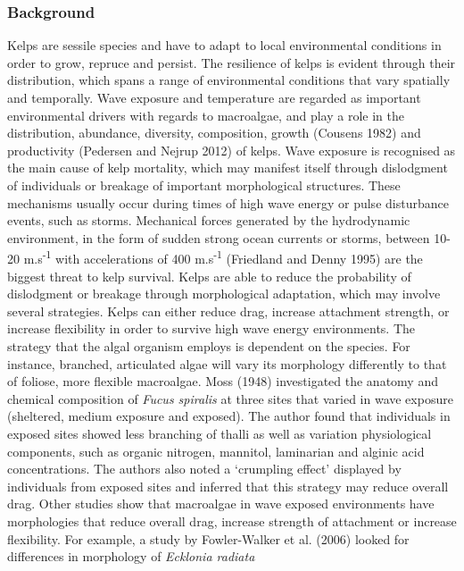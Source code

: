 \documentclass[10pt,a4,]{article}
\begin{document}
\hypertarget{background}{%
\subsubsection{Background}\label{background}}

Kelps are sessile species and have to adapt to local environmental
conditions in order to grow, repruce and persist. The resilience of
kelps is evident through their distribution, which spans a range of
environmental conditions that vary spatially and temporally. Wave
exposure and temperature are regarded as important environmental drivers
with regards to macroalgae, and play a role in the distribution,
abundance, diversity, composition, growth (Cousens 1982) and
productivity (Pedersen and Nejrup 2012) of kelps. Wave exposure is
recognised as the main cause of kelp mortality, which may manifest
itself through dislodgment of individuals or breakage of important
morphological structures. These mechanisms usually occur during times of
high wave energy or pulse disturbance events, such as storms. Mechanical
forces generated by the hydrodynamic environment, in the form of sudden
strong ocean currents or storms, between 10-20 m.s\textsuperscript{-1}
with accelerations of 400 m.s\textsuperscript{-1} (Friedland and Denny
1995) are the biggest threat to kelp survival. Kelps are able to reduce
the probability of dislodgment or breakage through morphological
adaptation, which may involve several strategies. Kelps can either
reduce drag, increase attachment strength, or increase flexibility in
order to survive high wave energy environments. The strategy that the
algal organism employs is dependent on the species. For instance,
branched, articulated algae will vary its morphology differently to that
of foliose, more flexible macroalgae. Moss (1948) investigated the
anatomy and chemical composition of \emph{Fucus spiralis} at three sites
that varied in wave exposure (sheltered, medium exposure and exposed).
The author found that individuals in exposed sites showed less branching
of thalli as well as variation physiological components, such as organic
nitrogen, mannitol, laminarian and alginic acid concentrations. The
authors also noted a `crumpling effect' displayed by individuals from
exposed sites and inferred that this strategy may reduce overall drag.
Other studies show that macroalgae in wave exposed environments have
morphologies that reduce overall drag, increase strength of attachment
or increase flexibility. For example, a study by Fowler-Walker et al.
(2006) looked for differences in morphology of \emph{Ecklonia radiata}
\end{document}
